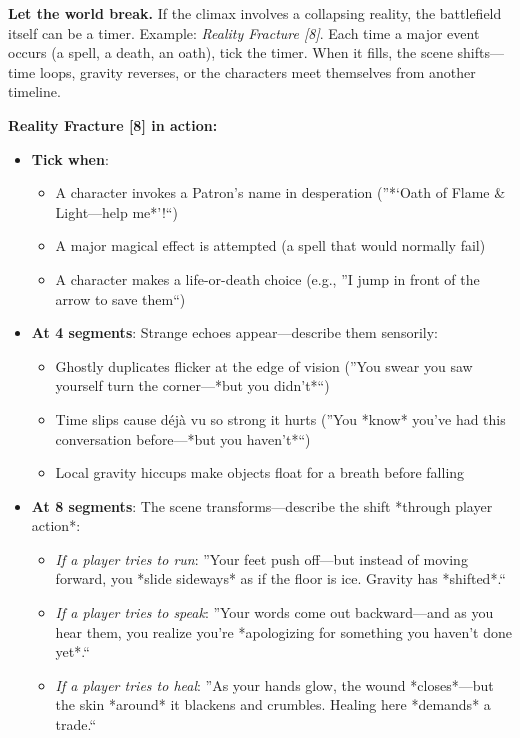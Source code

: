 {{{{{{{{{{{\begin{tcolorbox}[
  colback=green!5!white,
  colframe=green!75!black,
  title=At Tier V, Every Choice May Erase an Alternative Timeline,
  fonttitle=\bfseries
,breakable]
\medskip
\noindent\textbf{Let the world break.} If the climax involves a collapsing reality, the battlefield itself can be a timer. Example: \emph{Reality Fracture [8]}. Each time a major event occurs (a spell, a death, an oath), tick the timer. When it fills, the scene shifts---time loops, gravity reverses, or the characters meet themselves from another timeline.
\end{tcolorbox}

\textbf{Reality Fracture [8] in action:}
\begin{itemize}
  \item \textbf{Tick when}: 
        \begin{itemize}
          \item A character invokes a Patron's name in desperation (''*`Oath of Flame \& Light---help me*'!``) 
          \item A major magical effect is attempted (a spell that would normally fail) 
          \item A character makes a life-or-death choice (e.g., ''I jump in front of the arrow to save them``) 
        \end{itemize}
  \item \textbf{At 4 segments}: Strange echoes appear---describe them sensorily: 
        \begin{itemize}
          \item Ghostly duplicates flicker at the edge of vision (''You swear you saw yourself turn the corner---*but you didn't*``) 
          \item Time slips cause déjà vu so strong it hurts (''You *know* you've had this conversation before---*but you haven't*``) 
          \item Local gravity hiccups make objects float for a breath before falling 
        \end{itemize}
  \item \textbf{At 8 segments}: The scene transforms---describe the shift *through player action*: 
        \begin{itemize}
          \item \textit{If a player tries to run}: ''Your feet push off---but instead of moving forward, you *slide sideways* as if the floor is ice. Gravity has *shifted*.`` 
          \item \textit{If a player tries to speak}: ''Your words come out backward---and as you hear them, you realize you're *apologizing for something you haven't done yet*.`` 
          \item \textit{If a player tries to heal}: ''As your hands glow, the wound *closes*---but the skin *around* it blackens and crumbles. Healing here *demands* a trade.`` 

\end{itemize}
\end{itemize}}}}}}}}}}}}
